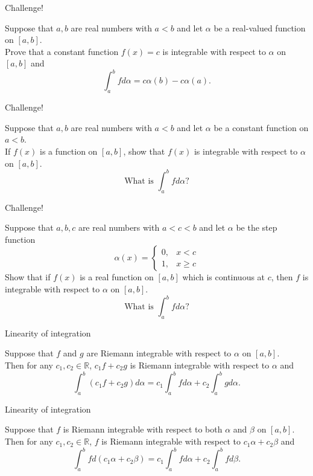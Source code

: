 \documentclass{beamer}
\begin{document}
\begin{frame}{Challenge!}
\begin{prob}
Suppose that $a,b$ are real numbers with $a<b$ and let $\alpha$ be a real-valued function on $[a,b]$.\\
Prove that a constant function $f(x) = c$ is integrable with respect to $\alpha$ on $[a,b]$ and
$$\int_a^b fd\alpha = c\alpha(b)-c\alpha(a).$$
\end{prob}
\end{frame}

\begin{frame}{Challenge!}
\begin{prob}
Suppose that $a,b$ are real numbers with $a<b$ and let $\alpha$ be a constant function on $a<b$.\\
If $f(x)$ is a function on $[a,b]$, show that $f(x)$ is integrable with respect to $\alpha$ on $[a,b]$.\\
$$\text{What is $\int_a^b fd\alpha$?}$$
\end{prob}
\end{frame}

\begin{frame}{Challenge!}
\begin{prob}
Suppose that $a,b,c$ are real numbers with $a<c<b$ and let $\alpha$ be the step function
$$\alpha(x) = \left\lbrace\begin{array}{cc}
0, & x < c\\
1, & x \geq c
\end{array}\right.$$
Show that if $f(x)$ is a real function on $[a,b]$ which is continuous at $c$, then $f$ is integrable with respect to $\alpha$ on $[a,b]$.\\
$$\text{What is $\int_a^b fd\alpha$?}$$
\end{prob}
\end{frame}

\begin{frame}{Linearity of integration}
\begin{thm}
Suppose that $f$ and $g$ are Riemann integrable with respect to $\alpha$ on $[a,b]$.\\
\pause
Then for any $c_1,c_2\in\mathbb{R}$, $c_1f + c_2g$ is Riemann integrable with respect to $\alpha$ and
$$\int_a^b (c_1f + c_2g) d\alpha = c_1\int_a^b f d\alpha + c_2\int_a^b g d\alpha.$$
\end{thm}
\end{frame}

\begin{frame}{Linearity of integration}
\begin{thm}
Suppose that $f$ is Riemann integrable with respect to both $\alpha$ and $\beta$ on $[a,b]$.\\
\pause
Then for any $c_1,c_2\in\mathbb{R}$, $f$ is Riemann integrable with respect to $c_1\alpha + c_2\beta$ and
$$\int_a^b f d(c_1\alpha + c_2\beta) = c_1\int_a^b f d\alpha + c_2\int_a^b f d\beta.$$
\end{thm}
\end{frame}
\end{document}
